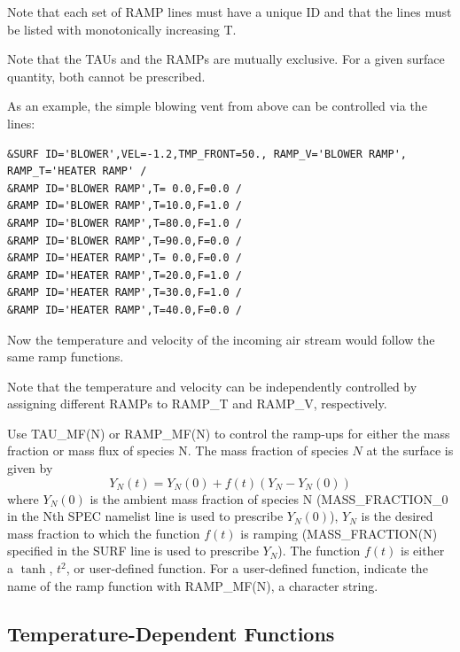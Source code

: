 \documentclass[11pt]{book}
\begin{document}
\begin{warning}
\noindent
Note that each set of {\ct RAMP} lines must have a unique {\ct ID} and that the lines must
be listed with monotonically increasing {\ct T}.
\end{warning}

\begin{warning}
\noindent
Note that the {\ct TAU}s and the {\ct RAMP}s are mutually exclusive. For a given
surface quantity, both cannot be prescribed.
\end{warning}

As an example, the simple blowing vent from above can be controlled via the lines:

\footnotesize
\begin{verbatim}
&SURF ID='BLOWER',VEL=-1.2,TMP_FRONT=50., RAMP_V='BLOWER RAMP', RAMP_T='HEATER RAMP' /
&RAMP ID='BLOWER RAMP',T= 0.0,F=0.0 /
&RAMP ID='BLOWER RAMP',T=10.0,F=1.0 /
&RAMP ID='BLOWER RAMP',T=80.0,F=1.0 /
&RAMP ID='BLOWER RAMP',T=90.0,F=0.0 /
&RAMP ID='HEATER RAMP',T= 0.0,F=0.0 /
&RAMP ID='HEATER RAMP',T=20.0,F=1.0 /
&RAMP ID='HEATER RAMP',T=30.0,F=1.0 /
&RAMP ID='HEATER RAMP',T=40.0,F=0.0 /
\end{verbatim}
\normalsize

\noindent
Now the temperature and velocity of the incoming air stream would
follow the same ramp functions.

\begin{warning}
\noindent
Note that the temperature and
velocity can be independently controlled by assigning different
{\ct RAMP}s to {\ct RAMP\_T} and {\ct RAMP\_V}, respectively.
\end{warning}

Use {\ct TAU\_MF(N)} or {\ct RAMP\_MF(N)}
to control the ramp-ups for either the mass
fraction or mass flux of species {\ct N}.
The mass fraction of species $N$ at the surface is given by
$$ Y_N(t) = Y_N(0) + f(t) \left( Y_N - Y_N(0) \right) $$
where $Y_N(0)$ is the ambient mass fraction of species {\ct N}
({\ct MASS\_FRACTION\_0} in
the {\ct N}th {\ct SPEC} namelist line is used to prescribe $Y_N(0)$),
$Y_N$ is the desired mass fraction to
which the function $f(t)$ is ramping ({\ct MASS\_FRACTION(N)}
specified in the {\ct SURF} line is used to prescribe $Y_N$).
The function $f(t)$ is either
a $\tanh$, $t^2$, or user-defined function. For a user-defined
function, indicate the name of the ramp function with {\ct RAMP\_MF(N)},
a character string.


\subsection{Temperature-Dependent Functions}
\end{document}
